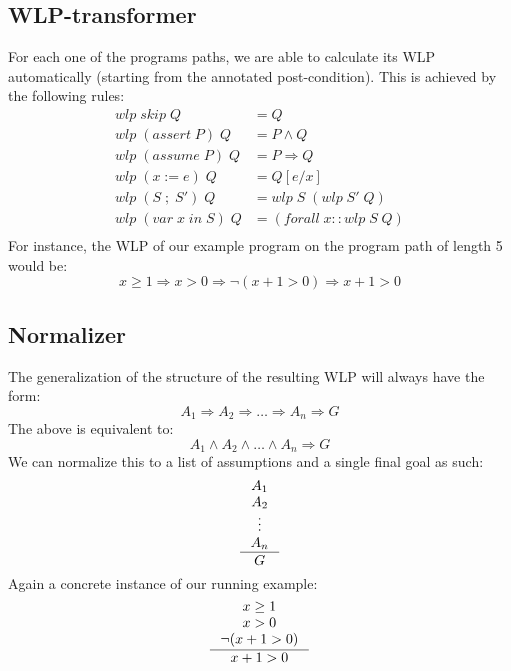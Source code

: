 \documentclass[nonatbib,numbers,10pt]{sigplanconf}
\begin{document}

\subsection{WLP-transformer}
For each one of the programs paths, we are able to calculate its WLP automatically (starting from the annotated post-condition). This is achieved by the following rules:
\begin{align*}
wlp \; skip \; Q &= Q \\
wlp \; (assert \; P) \; Q &= P \land Q \\
wlp \; (assume \; P) \; Q &= P \Rightarrow Q \\
wlp \; (x := e) \; Q &= Q[e/x] \\
wlp \; (S \; ; \; S') \; Q &= wlp \; S \; (wlp \; S' \; Q) \\
wlp \; (var \; x \; in \; S) \; Q &= (forall \; x :: wlp \; S \; Q) \\
\end{align*}
For instance, the WLP of our example program on the program path of length 5 would be:
\begin{equation*}
x \ge 1 \Rightarrow x > 0 \Rightarrow \neg (x + 1 > 0) \Rightarrow x + 1 > 0
\end{equation*}

\subsection{Normalizer}
The generalization of the structure of the resulting WLP will always have the form:
\begin{equation*}
A_1 \Rightarrow A_2 \Rightarrow \dots \Rightarrow A_n \Rightarrow G
\end{equation*}
The above is equivalent to:
\begin{equation*}
A_1 \land A_2 \land \dots \land A_n \Rightarrow G
\end{equation*}
We can normalize this to a list of assumptions and a single final goal as such:
\[
\inference {A_1 \\ A_2 \\ \vdots \\ A_n}{G}
\]
Again a concrete instance of our running example:
\[
\inference {x \ge 1 \\ x > 0 \\ \neg (x + 1 > 0)}{x + 1 > 0}
\]
\end{document}
